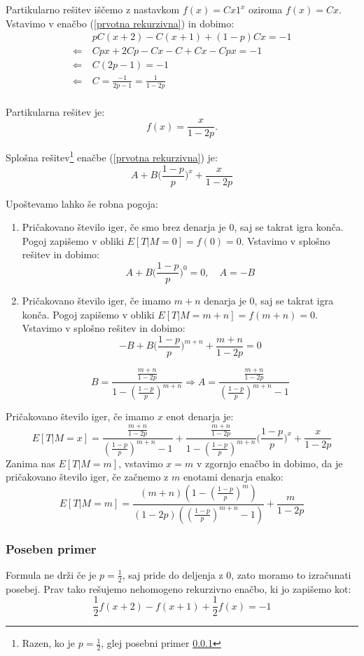 \documentclass[12pt, a4paper]{article}
\begin{document}
Partikularno rešitev iščemo z nastavkom $f(x)= Cx1^x$ oziroma $f(x)= Cx$. Vstavimo v enačbo (\ref{prvotna rekurzivna}) in dobimo: 
\begin{equation*}
\begin{split}
 &~pC(x+2)-C(x+1)+(1-p)Cx=-1\\
\Leftarrow & ~Cpx+2Cp-Cx-C+Cx-Cpx=-1 \\
\Leftarrow & ~C(2p-1)=-1\\
\Leftarrow & ~C=\frac{-1}{2p-1} = \frac{1}{1-2p}\\
\end{split}
\end{equation*}
 
Partikularna rešitev je: $$f(x)=\frac{x}{1-2p}.$$

Splošna rešitev\footnote{Razen, ko je $p=\frac{1}{2}$, glej posebni primer \ref{Posebni primer za 1/2} } enačbe (\ref{prvotna rekurzivna}) je: $$A + B\bigg( \frac{1-p}{p} \bigg )^x+\frac{x}{1-2p}$$

Upoštevamo lahko še robna pogoja:
\begin{enumerate}
\item Pričakovano število iger, če smo brez denarja je 0, saj se takrat igra konča. Pogoj zapišemo v obliki $E[T|M= 0] = f(0) = 0$. Vstavimo v splošno rešitev in dobimo:
$$A + B\bigg( \frac{1-p}{p} \bigg )^0 = 0, \quad A = -B$$
\item Pričakovano število iger, če imamo $m+n$ denarja je 0, saj se takrat igra konča. Pogoj zapišemo v obliki $E[T|M= m+n] = f(m+n) = 0$. Vstavimo v splošno rešitev in dobimo:
$$-B + B\bigg( \frac{1-p}{p} \bigg )^{m+n}+\frac{m+n}{1-2p}=0$$

$$B = \frac{\frac{m+n}{1-2p}}{1- \left(\frac{1-p}{p}\right)^{m+n}} \Rightarrow A = \frac{\frac{m+n}{1-2p}}{\left(\frac{1-p}{p}\right)^{m+n}-1}$$
\end{enumerate}

Pričakovano število iger, če imamo $x$ enot denarja je: $$E[ T | M = x]= \frac{\frac{m+n}{1-2p}}{\left(\frac{1-p}{p}\right)^{m+n}-1} + \frac{\frac{m+n}{1-2p}}{1- \left(\frac{1-p}{p}\right)^{m+n}}\bigg( \frac{1-p}{p} \bigg )^x+\frac{x}{1-2p}$$
 Zanima nas $E[T|M=m]$, vstavimo $x=m$ v zgornjo enačbo in dobimo, da je pričakovano število iger, če začnemo z $m$ enotami denarja enako: $$E[T|M=m]=\frac{(m+n) \left(1-\left(\frac{1-p}{p}\right)^m\right)}{(1-2 p)
   \left(\left(\frac{1-p}{p}\right)^{m+n}-1\right)}+\frac{m}{1-2 p}$$

\subsubsection{Poseben primer}
\label{Posebni primer za 1/2}
Formula ne drži če je $p = \frac{1}{2}$, saj pride do deljenja z 0, zato moramo to izračunati posebej. Prav tako rešujemo nehomogeno rekurzivno enačbo, ki jo zapišemo kot: 
\begin{equation}
\label{druga rekurzivna}
\frac{1}{2}f(x+2)-f(x+1)+\frac{1}{2}f(x)=-1
\end{equation}
\end{document}
